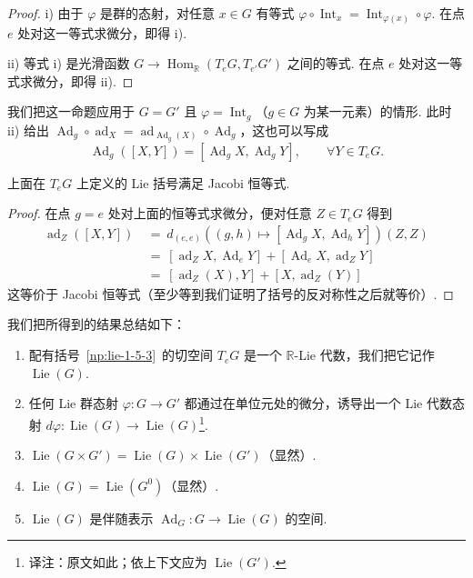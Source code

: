 \begin{proof}
i) 由于 $\varphi$ 是群的态射，对任意 $x\in G$ 有等式 $\varphi\circ\operatorname{Int}_x=\operatorname{Int}_{\varphi(x)}\circ\varphi$. 在点 $e$ 处对这一等式求微分，即得 i).

ii) 等式 i) 是光滑函数 $G\longrightarrow\operatorname{Hom}_{\mathbb{R}}(T_eG,T_{e'}G')$ 之间的等式. 在点 $e$ 处对这一等式求微分，即得 ii).
\end{proof}

我们把这一命题应用于 $G=G'$ 且 $\varphi=\operatorname{Int}_g$（$g\in G$ 为某一元素）的情形. 此时 ii) 给出 $\operatorname{Ad}_g\circ\operatorname{ad}_X=\operatorname{ad}_{\operatorname{Ad}_g(X)}\circ\operatorname{Ad}_g$，这也可以写成
\[
\operatorname{Ad}_g([X,Y])=[\operatorname{Ad}_gX,\operatorname{Ad}_gY],\qquad \forall Y\in T_eG.
\]
\begin{corollary}\label{cor:lie-1-5-6}
上面在 $T_eG$ 上定义的 Lie 括号满足 Jacobi 恒等式.
\end{corollary}

\begin{proof}
在点 $g=e$ 处对上面的恒等式求微分，便对任意 $Z\in T_eG$ 得到
\begin{align*}
\operatorname{ad}_Z([X,Y])\ &=\ d_{(e,e)}\left((g,h)\mapsto[\operatorname{Ad}_gX,\operatorname{Ad}_hY]\right)(Z,Z)\\
&=\ [\operatorname{ad}_ZX,\operatorname{Ad}_eY]+[\operatorname{Ad}_eX,\operatorname{ad}_ZY]\\
&=\ [\operatorname{ad}_Z(X),Y]+[X,\operatorname{ad}_Z(Y)]
\end{align*}
这等价于 Jacobi 恒等式（至少等到我们证明了括号的反对称性之后就等价）.
\end{proof}

\begin{numpara}[$G$ 的 Lie 代数]\label{np:lie-1-5-7}
我们把所得到的结果总结如下：
\begin{enumerate}[label=\roman*)]
\item 配有括号~\ref{np:lie-1-5-3}~的切空间 $T_eG$ 是一个 $\mathbb{R}$-Lie 代数，我们把它记作 $\operatorname{Lie}(G)$.
\item 任何 Lie 群态射 $\varphi:G\longrightarrow G'$ 都通过在单位元处的微分，诱导出一个 Lie 代数态射 $d\varphi:\operatorname{Lie}(G)\longrightarrow\operatorname{Lie}(G)$\footnote{译注：原文如此；依上下文应为 $\operatorname{Lie}(G')$.}.
\item $\operatorname{Lie}(G\times G')=\operatorname{Lie}(G)\times\operatorname{Lie}(G')$（显然）.
\item $\operatorname{Lie}(G)=\operatorname{Lie}(G^0)$（显然）.
\item $\operatorname{Lie}(G)$ 是伴随表示 $\operatorname{Ad}_G:G\longrightarrow\operatorname{Lie}(G)$ 的空间.
\end{enumerate}
\end{numpara}

